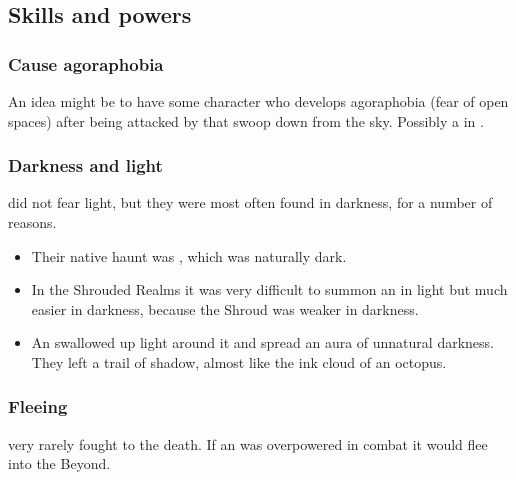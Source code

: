\subsection{Skills and powers}





\subsubsection{Cause agoraphobia}
An idea might be to have some character who develops agoraphobia (fear of open spaces) after being attacked by  that swoop down from the sky. 
Possibly a \resphan{} in \Merkyrah. 






\subsubsection{Darkness and light}
\Umbrae did not fear light, but they were most often found in darkness, for a number of reasons.

\begin{itemize}
  \item 
    Their native haunt was \Nyx, which was naturally dark.
  \item 
    In the Shrouded Realms it was very difficult to summon an \umbra in light but much easier in darkness, because the Shroud was weaker in darkness. 
  \item 
    An \umbra swallowed up light around it and spread an aura of unnatural darkness. 
    They left a trail of shadow, almost like the ink cloud of an octopus. 
\end{itemize}





\subsubsection{Fleeing}
\Umbrae very rarely fought to the death.
If an \umbra was overpowered in combat it would flee into the Beyond.





